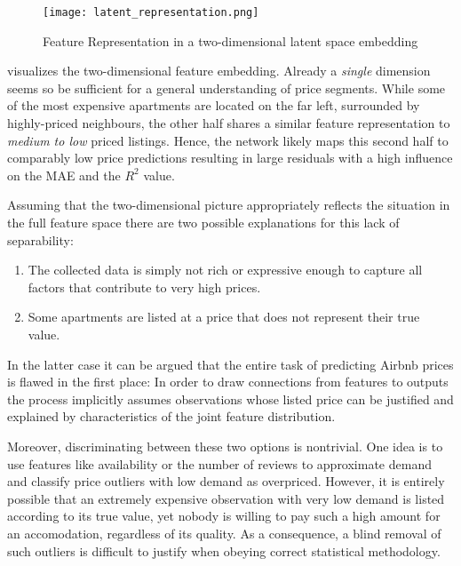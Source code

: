 \begin{figure}[t]
  \centering
  \texttt{[image: latent\_representation.png]}
  \caption{Feature Representation in a two-dimensional latent space embedding}
  \label{fig:latent-representation}
\end{figure}

 visualizes the two-dimensional feature embedding.
Already a \emph{single} dimension seems so be sufficient for a general understanding of price segments.
While some of the most expensive apartments are located on the far left, surrounded by highly-priced neighbours, the other half shares a similar feature representation to \emph{medium to low} priced listings.
Hence, the network likely maps this second half to comparably low price predictions resulting in large residuals with a high influence on the MAE and the $R^2$ value.

Assuming that the two-dimensional picture appropriately reflects the situation in the full feature space there are two possible explanations for this lack of separability:
\begin{enumerate}
  \item The collected data is simply not rich or expressive enough to capture all factors that contribute to very high prices.
  \item Some apartments are listed at a price that does not represent their true value.
\end{enumerate}

In the latter case it can be argued that the entire task of predicting Airbnb prices is flawed in the first place:
In order to draw connections from features to outputs the process implicitly assumes observations whose listed price can be justified and explained by characteristics of the joint feature distribution.

Moreover, discriminating between these two options is nontrivial.
One idea is to use features like availability or the number of reviews to approximate demand and classify price outliers with low demand as overpriced.
However, it is entirely possible that an extremely expensive observation with very low demand is listed according to its true value, yet nobody is willing to pay such a high amount for an accomodation, regardless of its quality.
As a consequence, a blind removal of such outliers is difficult to justify when obeying correct statistical methodology.












